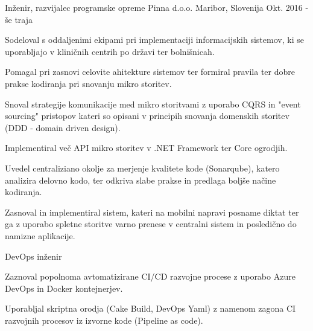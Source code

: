 

\begin{cventries}

  \cventry
    {Inženir, razvijalec programske opreme} %
    {Pinna d.o.o.} %
    {Maribor, Slovenija} %
    {Okt. 2016 - še traja} %
    {
      \begin{cvitems} %
        \item {Sodeloval s oddaljenimi ekipami pri implementaciji informacijskih sistemov, ki se uporabljajo v kliničnih centrih po državi ter bolnišnicah.}
        \item {Pomagal pri zasnovi celovite ahitekture sistemov ter formiral pravila ter dobre prakse kodiranja pri snovanju mikro storitev.}
        \item {Snoval strategije komunikacije med mikro storitvami z uporabo CQRS in "event sourcing" pristopov kateri so opisani v principih snovanja domenskih storitev (DDD - domain driven design).}
        \item {Implementiral več API mikro storitev v .NET Framework ter Core ogrodjih.}
        \item {Uvedel centraliziano okolje za merjenje kvalitete kode (Sonarqube), katero analizira delovno kodo, ter odkriva slabe prakse in predlaga boljše načine kodiranja.}
        \item {Zasnoval in implementiral sistem, kateri na mobilni napravi posname diktat ter ga z uporabo spletne storitve varno prenese v centralni sistem in posledično do namizne aplikacije.\\}
      \end{cvitems}
    }
    \cventry
    {DevOps inženir} %
    {} %
    {} %
    {} %
    {
      \begin{cvitems} %
        \item {Zaznoval popolnoma avtomatizirane CI/CD razvojne procese z uporabo Azure DevOps in Docker kontejnerjev.}
        \item {Uporabljal skriptna orodja (Cake Build, DevOps Yaml) z namenom zagona CI razvojnih procesov iz izvorne kode (Pipeline as code).\\}

\end{cvitems}}
\end{cventries}
